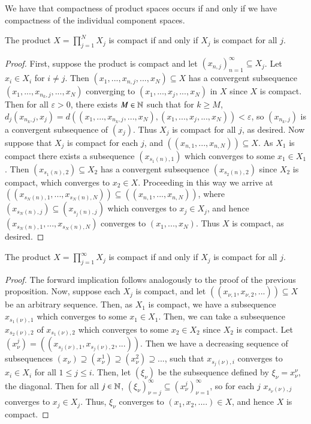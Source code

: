 We have that compactness of product spaces occurs if and only if we have compactness of the individual component spaces.

\begin{proposition}
    The product $X = \prod_{j=1}^NX_j$ is compact if and only if $X_j$ is compact for all $j$.
\end{proposition}
\begin{proof}
    First, suppose the product is compact and let $(x_{n,j})_{n=1}^{\infty} \subseteq X_j$. Let $x_i \in X_i$ for $i \neq j$. Then $(x_1,...,x_{n,j},...,x_N) \subseteq X$ has a convergent subsequence $(x_1,...,x_{n_k,j},...,x_N)$ converging to $(x_1,...,x_j,...,x_N)$ in $X$ since $X$ is compact. Then for all $\varepsilon > 0$, there exists $M \in \mathbb N$ such that for $k \geq M$, $d_j(x_{n_k,j},x_j) = d((x_1,...,x_{n_k,j},...,x_N),(x_1,...,x_j,...,x_N)) < \varepsilon$, so $(x_{n_k,j})$ is a convergent subsequence of $(x_j)$. Thus $X_j$ is compact for all $j$, as desired. Now suppose that $X_j$ is compact for each $j$, and $((x_{n,1},...,x_{n,N})) \subseteq X$. As $X_1$ is compact there exists a subsequence $(x_{s_1(n),1})$ which converges to some $x_1 \in X_1$. Then $(x_{s_1(n),2}) \subseteq X_2$ has a convergent subsequence $(x_{s_2(n),2})$ since $X_2$ is compact, which converges to $x_2 \in X$. Proceeding in this way we arrive at $((x_{s_N(n),1},...,x_{s_N(n),N})) \subseteq ((x_{n,1},...,x_{n,N}))$, where $(x_{s_N(n),j}) \subseteq (x_{s_j(n),j})$ which converges to $x_j \in X_j$, and hence $(x_{s_N(n),1},...,x_{s_N(n),N})$ converges to $(x_1,...,x_N)$. Thus $X$ is compact, as desired.
\end{proof}

\begin{proposition}
    The product $X = \prod_{j=1}^{\infty}X_j$ is compact if and only if $X_j$ is compact for all $j$.
\end{proposition}
\begin{proof}
    The forward implication follows analogously to the proof of the previous proposition. Now, suppose each $X_j$ is compact, and let $((x_{\nu,1},x_{\nu,2},...)) \subseteq X$ be an arbitrary sequence. Then, as $X_1$ is compact, we have a subsequence $x_{s_1(\nu),1}$ which converges to some $x_1 \in X_1$. Then, we can take a subsequence $x_{s_2(\nu),2}$ of $x_{s_1(\nu),2}$ which converges to some $x_2 \in X_2$ since $X_2$ is compact. Let $(x^j_{\nu}) = ((x_{s_j(\nu),1},x_{s_j(\nu),2},...))$. Then we have a decreasing sequence of subsequences $(x_{\nu}) \supseteq (x^1_{\nu}) \supseteq (x^2_{\nu}) \supseteq ...$, such that $x_{s_j(\nu),i}$ converges to $x_i \in X_i$ for all $1 \leq j \leq i$. Then, let $(\xi_{\nu})$ be the subsequence defined by $\xi_{\nu} = x^{\nu}_{\nu}$, the diagonal. Then for all $j \in \mathbb N$, $(\xi_{\nu})_{\nu=j}^{\infty} \subseteq (x^j_{\nu})_{\nu=1}^{\infty}$, so for each $j$ $x_{s_{\nu}(\nu),j}$ converges to $x_j \in X_j$. Thus, $\xi_{\nu}$ converges to $(x_1,x_2,....) \in X$, and hence $X$ is compact.
\end{proof}


